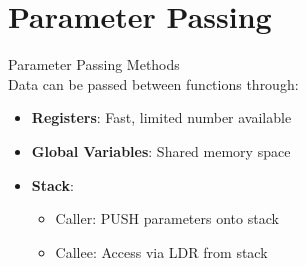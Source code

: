 \section{Parameter Passing}

\begin{concept}{Parameter Passing Methods}\\
Data can be passed between functions through:
\begin{itemize}
  \item \textbf{Registers}: Fast, limited number available
  \item \textbf{Global Variables}: Shared memory space
  \item \textbf{Stack}: 
    \begin{itemize}
      \item Caller: PUSH parameters onto stack
      \item Callee: Access via LDR from stack
    \end{itemize}
\end{itemize}
\end{concept}

